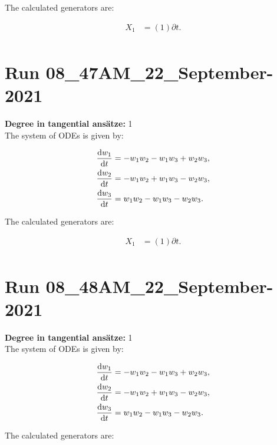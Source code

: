 \noindent The calculated generators are:

\begin{align*}
X_{1}&=\left( 1 \right)\partial t.\\
\end{align*}
\section*{Run 08\_47AM\_22\_September-2021}
\textbf{Degree in tangential ansätze:}	1\\
The system of ODEs is given by:

\begin{align*}
\dv{w_{1}}{t}&=- w_{1} w_{2} - w_{1} w_{3} + w_{2} w_{3},\\
\dv{w_{2}}{t}&=- w_{1} w_{2} + w_{1} w_{3} - w_{2} w_{3},\\
\dv{w_{3}}{t}&=w_{1} w_{2} - w_{1} w_{3} - w_{2} w_{3}.\\
\end{align*}

\noindent The calculated generators are:

\begin{align*}
X_{1}&=\left( 1 \right)\partial t.\\
\end{align*}
\section*{Run 08\_48AM\_22\_September-2021}
\textbf{Degree in tangential ansätze:}	1\\
The system of ODEs is given by:

\begin{align*}
\dv{w_{1}}{t}&=- w_{1} w_{2} - w_{1} w_{3} + w_{2} w_{3},\\
\dv{w_{2}}{t}&=- w_{1} w_{2} + w_{1} w_{3} - w_{2} w_{3},\\
\dv{w_{3}}{t}&=w_{1} w_{2} - w_{1} w_{3} - w_{2} w_{3}.\\
\end{align*}

\noindent The calculated generators are:

